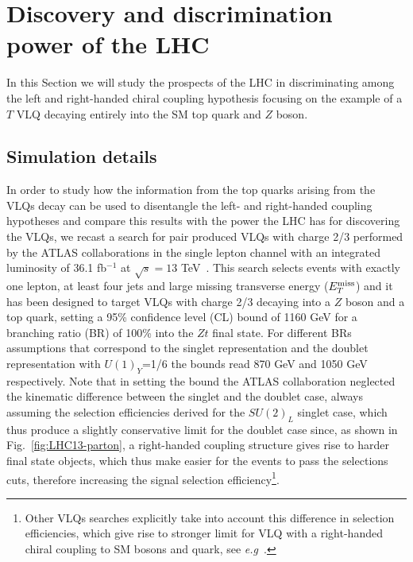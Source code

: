 \documentclass[a4paper]{article}
\begin{document}
\section{Discovery and discrimination power of the LHC}
\label{sec:LHC}

In this Section we will study the prospects of the LHC in discriminating among the left and right-handed chiral coupling hypothesis focusing on the example of a $T$ VLQ decaying entirely into the SM top quark and $Z$ boson. 


\subsection{Simulation details}

In order to study how the information from the top quarks arising from the VLQs decay can be used to disentangle the left- and right-handed coupling hypotheses and compare this results with the power the LHC has for discovering the VLQs, we recast a search for pair produced VLQs with charge 2/3 performed by the ATLAS collaborations in the single lepton channel with an integrated luminosity of 36.1 fb$^{-1}$ at $\sqrt{s}=13$ TeV~\cite{Aaboud:2017qpr}.
This search selects events with exactly one lepton, at least four jets and large missing transverse energy ($E_T^{\rm miss}$) and it has been designed to target VLQs with charge 2/3 decaying into a $Z$ boson and a top quark, setting a 95\% confidence level (CL) bound of 1160 GeV for a branching ratio (BR) of 100\% into the $Zt$ final state. For different BRs assumptions that correspond to the singlet representation and the doublet representation with $U(1)_Y$=1/6 the bounds read 870 GeV and 1050 GeV respectively. Note that in setting the bound the ATLAS collaboration neglected the kinematic difference between the singlet and the doublet case, always assuming the selection efficiencies derived for the $SU(2)_L$ singlet case, which thus produce a slightly conservative limit for the doublet case since, as shown in Fig.~\ref{fig:LHC13-parton}, a right-handed coupling structure gives rise to harder final state objects, which thus make easier for the events to pass the selections cuts, therefore increasing the signal selection efficiency\footnote{Other VLQs searches explicitly take into account this difference in selection efficiencies, which give rise to stronger limit for VLQ with a right-handed chiral coupling to SM bosons and quark, see {\emph{e.g}}~\cite{CMS:2017wwc}.}.
\end{document}
